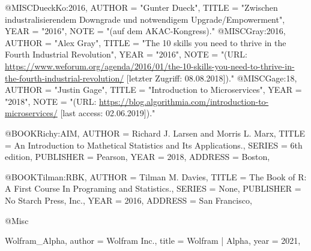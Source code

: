@MISC{DueckKo:2016,
  AUTHOR       = "Gunter Dueck",
  TITLE        = "{Zwischen industralisierendem Downgrade und notwendigem Upgrade/Empowerment}",
  YEAR 		   = "2016",
  NOTE         = "(auf dem AKAC-Kongress)."
}
@MISC{Gray:2016,
  AUTHOR       = "Alex Gray",
  TITLE        = "The 10 skills you need to thrive in the Fourth Industrial Revolution",
  YEAR 		   = "2016",
  NOTE         = "(URL: \url{https://www.weforum.org/agenda/2016/01/the-10-skills-you-need-to-thrive-in-the-fourth-industrial-revolution/} [letzter Zugriff: 08.08.2018])."
}
@MISC{Gage:18,
  AUTHOR       = "Justin Gage",
  TITLE        = "{Introduction to Microservices}",
  YEAR 		   = "2018",
  NOTE         = "(URL: \url{https://blog.algorithmia.com/introduction-to-microservices/} [last access: 02.06.2019])."
}


@BOOK{Richy:AIM,
  AUTHOR       = {Richard J. Larsen and Morris L. Marx},
  TITLE        = {An Introduction to Mathetical Statistics and Its Applications.},
  SERIES       = {6th edition},
  PUBLISHER    = {Pearson},
  YEAR         = {2018},
  ADDRESS      = {Boston},
}


@BOOK{Tilman:RBK,
  AUTHOR       = {Tilman M. Davies},
  TITLE        = {The Book of R: A First Course In Programing and Statistics.},
  SERIES       = {None},
  PUBLISHER    = {No Starch Press, Inc.},
  YEAR         = {2016},
  ADDRESS      = {San Francisco},
}


@Misc{Wolfram_Alpha,
  author = {Wolfram Inc.},
  title = {Wolfram | Alpha},
  year = {2021},
  
}
  
